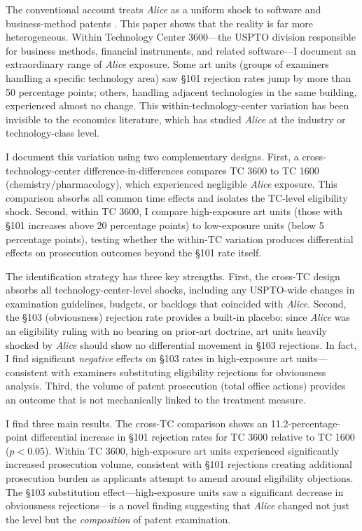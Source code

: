 \documentclass[12pt]{article}
\begin{document}
The conventional account treats \textit{Alice} as a uniform shock to software and business-method patents \citep{allison2020, lemley2020}. This paper shows that the reality is far more heterogeneous. Within Technology Center 3600---the USPTO division responsible for business methods, financial instruments, and related software---I document an extraordinary range of \textit{Alice} exposure. Some art units (groups of examiners handling a specific technology area) saw \S101 rejection rates jump by more than 50 percentage points; others, handling adjacent technologies in the same building, experienced almost no change. This within-technology-center variation has been invisible to the economics literature, which has studied \textit{Alice} at the industry \citep{caskurlu2022} or technology-class level.

I document this variation using two complementary designs. First, a cross-technology-center difference-in-differences compares TC 3600 to TC 1600 (chemistry/pharmacology), which experienced negligible \textit{Alice} exposure. This comparison absorbs all common time effects and isolates the TC-level eligibility shock. Second, within TC 3600, I compare high-exposure art units (those with \S101 increases above 20 percentage points) to low-exposure units (below 5 percentage points), testing whether the within-TC variation produces differential effects on prosecution outcomes beyond the §101 rate itself.

The identification strategy has three key strengths. First, the cross-TC design absorbs all technology-center-level shocks, including any USPTO-wide changes in examination guidelines, budgets, or backlogs that coincided with \textit{Alice}. Second, the \S103 (obviousness) rejection rate provides a built-in placebo: since \textit{Alice} was an eligibility ruling with no bearing on prior-art doctrine, art units heavily shocked by \textit{Alice} should show no differential movement in \S103 rejections. In fact, I find significant \textit{negative} effects on \S103 rates in high-exposure art units---consistent with examiners substituting eligibility rejections for obviousness analysis. Third, the volume of patent prosecution (total office actions) provides an outcome that is not mechanically linked to the treatment measure.

I find three main results. The cross-TC comparison shows an 11.2-percentage-point differential increase in \S101 rejection rates for TC 3600 relative to TC 1600 ($p < 0.05$). Within TC 3600, high-exposure art units experienced significantly increased prosecution volume, consistent with \S101 rejections creating additional prosecution burden as applicants attempt to amend around eligibility objections. The §103 substitution effect---high-exposure units saw a significant decrease in obviousness rejections---is a novel finding suggesting that \textit{Alice} changed not just the level but the \textit{composition} of patent examination.
\end{document}

